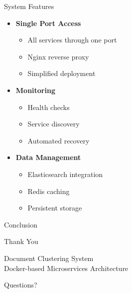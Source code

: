 \documentclass[notes]{beamer}
\begin{document}
\begin{frame}{System Features}
    \begin{itemize}
        \item \textbf{Single Port Access}
        \begin{itemize}
            \item All services through one port
            \item Nginx reverse proxy
            \item Simplified deployment
        \end{itemize}
        \item \textbf{Monitoring}
        \begin{itemize}
            \item Health checks
            \item Service discovery
            \item Automated recovery
        \end{itemize}
        \item \textbf{Data Management}
        \begin{itemize}
            \item Elasticsearch integration
            \item Redis caching
            \item Persistent storage
        \end{itemize}
    \end{itemize}
\end{frame}

\begin{frame}{Conclusion}
    \begin{center}
        \Large{Thank You}
        
        \vspace{0.5cm}
        \normalsize{Document Clustering System}\\
        Docker-based Microservices Architecture
        
        \vspace{0.5cm}
        Questions?
    \end{center}
\end{frame}
\end{document}
